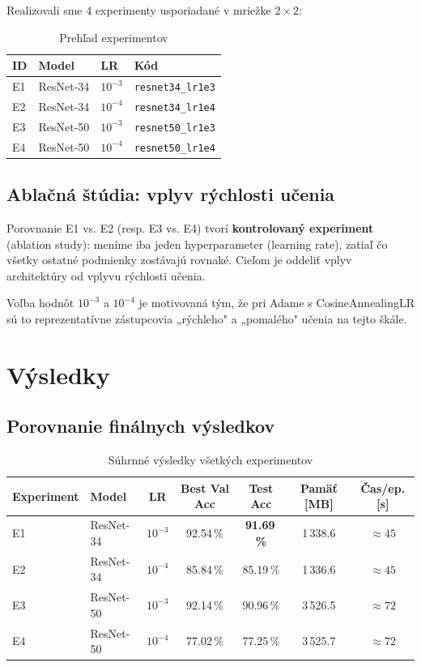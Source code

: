 \documentclass[12pt,a4paper]{article}
\begin{document}
Realizovali sme 4 experimenty usporiadané v mriežke $2 \times 2$:

\begin{table}[H]
\centering
\caption{Prehľad experimentov}
\begin{tabular}{llll}
\toprule
\textbf{ID} & \textbf{Model} & \textbf{LR} & \textbf{Kód} \\
\midrule
E1 & ResNet-34 & $10^{-3}$ & \texttt{resnet34\_lr1e3} \\
E2 & ResNet-34 & $10^{-4}$ & \texttt{resnet34\_lr1e4} \\
E3 & ResNet-50 & $10^{-3}$ & \texttt{resnet50\_lr1e3} \\
E4 & ResNet-50 & $10^{-4}$ & \texttt{resnet50\_lr1e4} \\
\bottomrule
\end{tabular}
\end{table}

\subsection{Ablačná štúdia: vplyv rýchlosti učenia}

Porovnanie E1 vs. E2 (resp. E3 vs. E4) tvorí \textbf{kontrolovaný experiment}
(ablation study): meníme iba jeden hyperparameter (learning rate), zatiaľ čo
všetky ostatné podmienky zostávajú rovnaké. Cieľom je oddeliť vplyv architektúry
od vplyvu rýchlosti učenia.

Voľba hodnôt $10^{-3}$ a $10^{-4}$ je motivovaná tým, že pri Adame s CosineAnnealingLR
sú to reprezentatívne zástupcovia „rýchleho" a „pomalého" učenia na tejto škále.

\section{Výsledky}

\subsection{Porovnanie finálnych výsledkov}

\begin{table}[H]
\centering
\caption{Súhrnné výsledky všetkých experimentov}
\begin{tabular}{llccccc}
\toprule
\textbf{Experiment} & \textbf{Model} & \textbf{LR} &
\textbf{Best Val Acc} & \textbf{Test Acc} &
\textbf{Pamäť [MB]} & \textbf{Čas/ep. [s]} \\
\midrule
E1 & ResNet-34 & $10^{-3}$ & 92.54\,\% & \textbf{91.69\,\%} & 1\,338.6 & $\approx 45$ \\
E2 & ResNet-34 & $10^{-4}$ & 85.84\,\% & 85.19\,\% & 1\,336.6 & $\approx 45$ \\
E3 & ResNet-50 & $10^{-3}$ & 92.14\,\% & 90.96\,\% & 3\,526.5 & $\approx 72$ \\
E4 & ResNet-50 & $10^{-4}$ & 77.02\,\% & 77.25\,\% & 3\,525.7 & $\approx 72$ \\
\bottomrule
\end{tabular}
\end{table}
\end{document}
